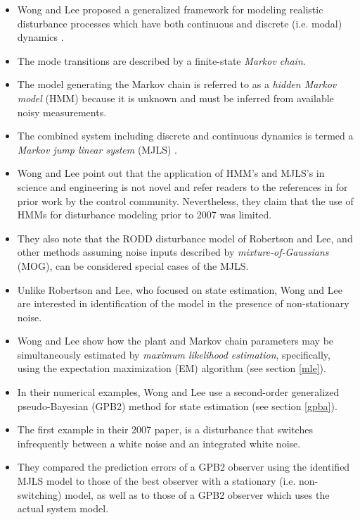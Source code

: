 \begin{itemize}
	\item Wong and Lee proposed a generalized framework for modeling realistic disturbance processes which have both continuous and discrete (i.e. modal) dynamics \citep{wong_disturbance_2007}.
	\item The mode transitions are described by a finite-state \textit{Markov chain}.
	\item The model generating the Markov chain is referred to as a \textit{hidden Markov model} (HMM) because it is unknown and must be inferred from available noisy measurements.
	\item The combined system including discrete and continuous dynamics is termed a \textit{Markov jump linear system} (MJLS) \citep{costa_discrete-time_2005}.
	\item Wong and Lee point out that the application of HMM's and MJLS's in science and engineering is not novel and refer readers to the references in \cite{costa_discrete-time_2005} for prior work by the control community. Nevertheless, they claim that the use of HMMs for disturbance modeling prior to 2007 was limited.
	\item They also note that the RODD disturbance model of Robertson and Lee, and other methods assuming noise inputs described by \textit{mixture-of-Gaussians} (MOG), can be considered special cases of the MJLS.
	\item Unlike Robertson and Lee, who focused on state estimation, Wong and Lee are interested in identification of the model in the presence of non-stationary noise.
	\item Wong and Lee show how the plant and Markov chain parameters may be simultaneously estimated by \textit{maximum likelihood estimation}, specifically, using the expectation maximization (EM) algorithm (see section \ref{mle}).
	\item In their numerical examples, Wong and Lee use a second-order generalized pseudo-Bayesian (GPB2)  method for state estimation \citep{bar-shalom_estimation_1993} (see section \ref{gpba}).
	\item The first example in their 2007 paper, is a disturbance that switches infrequently between a white noise and an integrated white noise.
	\item They compared the prediction errors of a GPB2 observer using the identified MJLS model to those of the best observer with a stationary (i.e. non-switching) model, as well as to those of a GPB2 observer which uses the actual system model.

\end{itemize}
